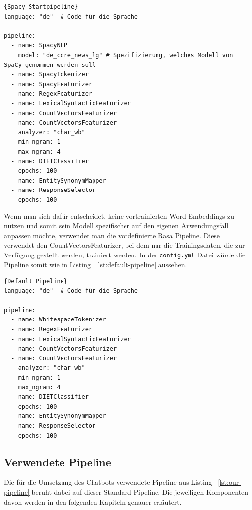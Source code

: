 \begin{lstlisting}[label={lst:spacy-pipeline},caption={Spacy Startpipeline}]{Spacy Startpipeline}
language: "de"  # Code für die Sprache

pipeline:
  - name: SpacyNLP
    model: "de_core_news_lg" # Spezifizierung, welches Modell von SpaCy genommen werden soll
  - name: SpacyTokenizer
  - name: SpacyFeaturizer
  - name: RegexFeaturizer
  - name: LexicalSyntacticFeaturizer
  - name: CountVectorsFeaturizer
  - name: CountVectorsFeaturizer
    analyzer: "char_wb"
    min_ngram: 1
    max_ngram: 4
  - name: DIETClassifier
    epochs: 100
  - name: EntitySynonymMapper
  - name: ResponseSelector
    epochs: 100

\end{lstlisting}

Wenn man sich dafür entscheidet, keine vortrainierten Word Embeddings zu nutzen und somit sein Modell spezifischer auf den eigenen Anwendungsfall anpassen möchte, verwendet man die vordefinierte Rasa Pipeline.
Diese verwendet den CountVectorsFeaturizer, bei dem nur die Trainingsdaten, die zur Verfügung gestellt werden, trainiert werden.\cite{startingPipelines, allComponents, nluExamples}
In der \texttt{config.yml} Datei würde die Pipeline somit wie in Listing ~\ref{lst:default-pipeline} aussehen.

\begin{lstlisting}[label={lst:default-pipeline},caption={Default Pipeline}]{Default Pipeline}
language: "de"  # Code für die Sprache

pipeline:
  - name: WhitespaceTokenizer
  - name: RegexFeaturizer
  - name: LexicalSyntacticFeaturizer
  - name: CountVectorsFeaturizer
  - name: CountVectorsFeaturizer
    analyzer: "char_wb"
    min_ngram: 1
    max_ngram: 4
  - name: DIETClassifier
    epochs: 100
  - name: EntitySynonymMapper
  - name: ResponseSelector
    epochs: 100

\end{lstlisting}

\subsection{Verwendete Pipeline}\label{subsec:our-pipeline}

Die für die Umsetzung des Chatbots verwendete Pipeline aus Listing ~\ref{lst:our-pipeline} beruht dabei auf dieser Standard-Pipeline.
Die jeweiligen Komponenten davon werden in den folgenden Kapiteln genauer erläutert.

